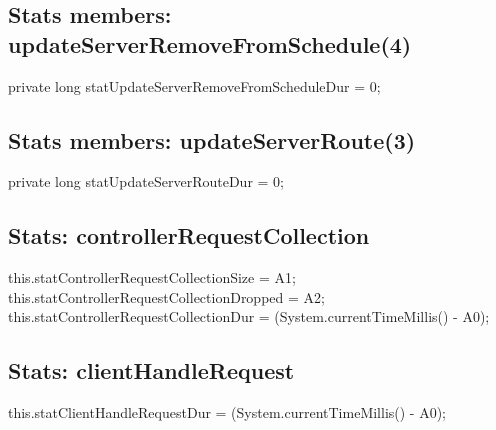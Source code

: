 \subsection{Stats members: updateServerRemoveFromSchedule(4)}
\nwenddocs{}\endmoddef{}
private long statUpdateServerRemoveFromScheduleDur = 0;
\nwendcode{}\nwdocspar

\subsection{Stats members: updateServerRoute(3)}
\nwenddocs{}\endmoddef{}
private long statUpdateServerRouteDur = 0;
\nwendcode{}\nwdocspar

\subsection{Stats: controllerRequestCollection}
\nwenddocs{}\endmoddef{}
this.statControllerRequestCollectionSize = A1;
this.statControllerRequestCollectionDropped = A2;
this.statControllerRequestCollectionDur = (System.currentTimeMillis() - A0);
\nwendcode{}\nwdocspar

\subsection{Stats: clientHandleRequest}
\nwenddocs{}\endmoddef{}
this.statClientHandleRequestDur = (System.currentTimeMillis() - A0);
\nwendcode{}\nwdocspar

